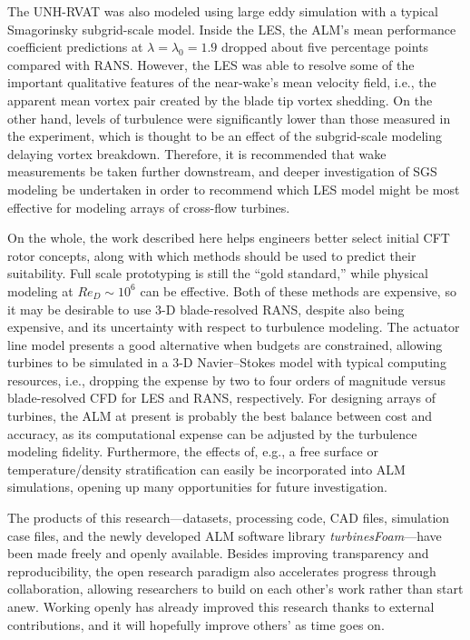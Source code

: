 The UNH-RVAT was also modeled using large eddy simulation with a typical
Smagorinsky subgrid-scale model. Inside the LES, the ALM's mean performance
coefficient predictions at $\lambda=\lambda_0=1.9$ dropped about five percentage
points compared with RANS. However, the LES was able to resolve some of the
important qualitative features of the near-wake's mean velocity field, i.e., the
apparent mean vortex pair created by the blade tip vortex shedding. On the other
hand, levels of turbulence were significantly lower than those measured in the
experiment, which is thought to be an effect of the subgrid-scale modeling
delaying vortex breakdown. Therefore, it is recommended that wake measurements
be taken further downstream, and deeper investigation of SGS modeling be
undertaken in order to recommend which LES model might be most effective for
modeling arrays of cross-flow turbines.

On the whole, the work described here helps engineers better select initial CFT
rotor concepts, along with which methods should be used to predict their
suitability. Full scale prototyping is still the ``gold standard,'' while
physical modeling at $Re_D \sim 10^6$ can be effective. Both of these methods
are expensive, so it may be desirable to use 3-D blade-resolved RANS, despite
also being expensive, and its uncertainty with respect to turbulence modeling.
The actuator line model presents a good alternative when budgets are
constrained, allowing turbines to be simulated in a 3-D Navier--Stokes model
with typical computing resources, i.e., dropping the expense by two to four
orders of magnitude versus blade-resolved CFD for LES and RANS, respectively.
For designing arrays of turbines, the ALM at present is probably the best
balance between cost and accuracy, as its computational expense can be adjusted
by the turbulence modeling fidelity. Furthermore, the effects of, e.g., a free
surface or temperature/density stratification can easily be incorporated into
ALM simulations, opening up many opportunities for future investigation.

The products of this research---datasets, processing code, CAD files, simulation
case files, and the newly developed ALM software library
\textit{turbinesFoam}---have been made freely and openly available. Besides
improving transparency and reproducibility, the open research paradigm also
accelerates progress through collaboration, allowing researchers to build on
each other's work rather than start anew. Working openly has already improved
this research thanks to external contributions, and it will hopefully improve
others' as time goes on.
